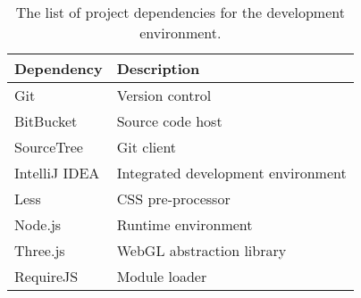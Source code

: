 \begin{table}[H]
\caption[Development environment]{The list of project dependencies for the development environment.}
\label{tab:development_environment}
\begin{tabularx}{\textwidth}{@{}XX@{}}
	\toprule
	\textbf{Dependency} & \textbf{Description} \\
	\midrule
	Git & Version control \\
	BitBucket & Source code host \\
	SourceTree & Git client \\
	IntelliJ IDEA & Integrated development environment \\
	Less & CSS pre-processor \\
	Node.js & Runtime environment \\
	Three.js & WebGL abstraction library \\
	RequireJS & Module loader \\
	\bottomrule
\end{tabularx}
\end{table}
